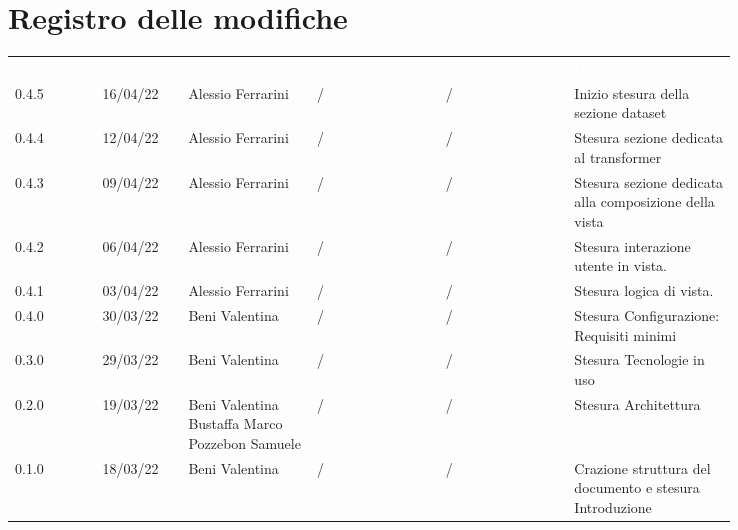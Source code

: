 \section*{Registro delle modifiche}

{\renewcommand{\arraystretch}{1.5}
\scriptsize
\begin{tabular}{p{0.10\linewidth}p{0.10\linewidth}p{0.15\linewidth}p{0.15\linewidth}p{0.15\linewidth}p{0.19\linewidth}}
	\rowcolor[RGB]{33, 73, 50}
	\textcolor{white}{\textbf{Versione}} & \textcolor{white}{\textbf{Data}} &
	\textcolor{white}{\textbf{Redattore}} & \textcolor{white}{\textbf{Verificatore}} &
	\textcolor{white}{\textbf{Approvatore}} & \textcolor{white}{\textbf{Descrizione}}\\
	\rowcolor[RGB]{216, 235, 171}
	0.4.5 & 16/04/22 & Alessio Ferrarini & / & / & Inizio stesura della sezione
  dataset \\
	\rowcolor[RGB]{233, 245, 206}
	0.4.4 & 12/04/22 & Alessio Ferrarini & / & / & Stesura sezione dedicata al
  transformer \\
	\rowcolor[RGB]{216, 235, 171}
	0.4.3 & 09/04/22 & Alessio Ferrarini & / & / & Stesura sezione dedicata alla
  composizione della vista \\
	\rowcolor[RGB]{233, 245, 206}
	0.4.2 & 06/04/22 & Alessio Ferrarini & / & / & Stesura interazione utente in
  vista. \\
	\rowcolor[RGB]{216, 235, 171}
	0.4.1 & 03/04/22 & Alessio Ferrarini & / & / & Stesura logica di vista. \\
	\rowcolor[RGB]{233, 245, 206}
	0.4.0 & 30/03/22 & Beni Valentina & / & / & Stesura Configurazione: Requisiti minimi\\
	\rowcolor[RGB]{216, 235, 171}
	0.3.0 & 29/03/22 & Beni Valentina & / & / & Stesura Tecnologie in uso\\
	\rowcolor[RGB]{233, 245, 206}
	0.2.0 & 19/03/22 & Beni Valentina Bustaffa Marco Pozzebon Samuele & / & / & Stesura Architettura\\
	\rowcolor[RGB]{216, 235, 171}
	0.1.0 & 18/03/22 & Beni Valentina & / & / & Crazione struttura del documento e stesura Introduzione\\	
\end{tabular}	
}
